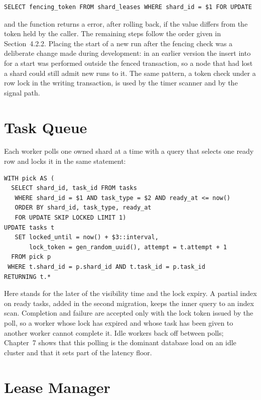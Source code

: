 \begin{lstlisting}[caption={Fencing check at the start of every commit},
  label={lst:verify}]
SELECT fencing_token FROM shard_leases WHERE shard_id = $1 FOR UPDATE
\end{lstlisting}

\noindent and the function returns a  error, after rolling back,
if the value differs from the token held by the caller. The remaining steps
follow the order given in Section~4.2.2. Placing the start of a new run
after the fencing check was a deliberate change made during development: in
an earlier version the insert into  for a start was performed
outside the fenced transaction, so a node that had lost a shard could still
admit new runs to it. The same pattern, a token check under a row lock in the
writing transaction, is used by the timer scanner and by the signal path.

\section{Task Queue}

Each worker polls one owned shard at a time with a query that selects one
ready row and locks it in the same statement:

\begin{lstlisting}[caption={Task poll (simplified)}, label={lst:poll}]
WITH pick AS (
  SELECT shard_id, task_id FROM tasks
   WHERE shard_id = $1 AND task_type = $2 AND ready_at <= now()
   ORDER BY shard_id, task_type, ready_at
   FOR UPDATE SKIP LOCKED LIMIT 1)
UPDATE tasks t
   SET locked_until = now() + $3::interval,
       lock_token = gen_random_uuid(), attempt = t.attempt + 1
  FROM pick p
 WHERE t.shard_id = p.shard_id AND t.task_id = p.task_id
RETURNING t.*
\end{lstlisting}

\noindent Here  stands for the later of the visibility time and
the lock expiry.
A partial index on ready tasks, added in the second migration, keeps the
inner query to an index scan. Completion and failure are accepted only with
the lock token issued by the poll, so a worker whose lock has expired and
whose task has been given to another worker cannot complete it. Idle workers
back off between polls; Chapter~7 shows that this polling is the dominant
database load on an idle cluster and that it sets part of the latency floor.

\section{Lease Manager}

